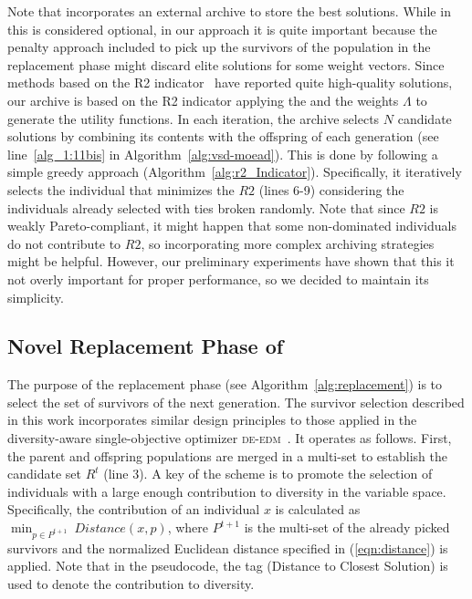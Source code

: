 Note that \AVSDMOEAD{} incorporates an external archive to store the best solutions.
%
While in \MOEAD{} this is considered optional, in our approach it is quite important because the penalty approach
included to pick up the survivors of the population in the replacement phase might discard elite solutions for some weight vectors.
%
Since methods based on the R2 indicator~\cite{trautmann2013r2} have reported quite high-quality solutions, our
archive is based on the R2 indicator applying the \ASF{} and the weights $\Lambda$ to generate the utility functions.
%
In each iteration, the archive selects $N$ candidate solutions by combining its contents with the offspring of each 
generation (see line~\ref{alg_1:11bis} in Algorithm~\ref{alg:vsd-moead}).
%
This is done by following a simple greedy approach (Algorithm~\ref{alg:r2_Indicator}).
%
Specifically, it iteratively selects the individual that minimizes the $R2$ (lines 6-9) considering
the individuals already selected with ties broken randomly.
%
Note that since $R2$ is weakly Pareto-compliant, it might happen that some non-dominated individuals do not contribute
to $R2$, so incorporating more complex archiving strategies might be helpful.
%
However, our preliminary experiments have shown that this it not overly important for proper performance, so we decided to maintain
its simplicity.
%

%
\subsection{Novel Replacement Phase of \AVSDMOEAD{} }

The purpose of the replacement phase (see Algorithm~\ref{alg:replacement}) is to select the set of survivors of the next generation.
%
The survivor selection described in this work incorporates similar design principles to those applied in 
the diversity-aware single-objective optimizer \textsc{de-edm}~\cite{castillo2019differential}.
%
It operates as follows.
%
First, the parent and offspring populations are merged in a multi-set to establish the candidate set $R^t$ (line 3).
%
A key of the scheme is to promote the selection of individuals with a large enough contribution to diversity
in the variable space.
%
Specifically, the contribution of an individual $x$ is calculated as $\displaystyle{\min_{p \in P^{t+1}}\ Distance(x, p)}$, 
where $P^{t+1}$ is the multi-set of the already picked survivors and the normalized Euclidean distance
specified in (\ref{eqn:distance}) is applied.
%
Note that in the pseudocode, the tag \DCS{} (Distance to Closest Solution) is used to denote the contribution to diversity.

